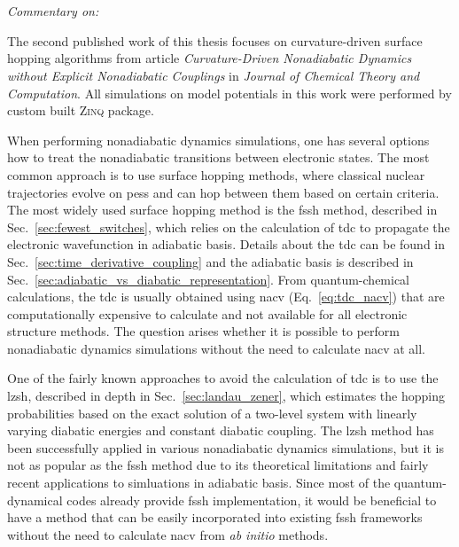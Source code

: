 \section{\filetotitle}\label{sec:curvature_driven_surface_hopping_algorithms}
\textit{Commentary on: }

The second published work of this thesis focuses on curvature-driven surface hopping algorithms from article \textit{Curvature-Driven Nonadiabatic Dynamics without Explicit Nonadiabatic Couplings} in \textit{Journal of Chemical Theory and Computation}. All simulations on model potentials in this work were performed by custom built \textsc{Zinq} package.\supercite{10.5281/zenodo.18386143}

When performing nonadiabatic dynamics simulations, one has several options how to treat the nonadiabatic transitions between electronic states. The most common approach is to use surface hopping methods, where classical nuclear trajectories evolve on \glspl{pes} and can hop between them based on certain criteria. The most widely used surface hopping method is the \acrfull{fssh} method, described in Sec.~\ref{sec:fewest_switches}, which relies on the calculation of \acrfull{tdc} to propagate the electronic wavefunction in adiabatic basis. Details about the \acrshort{tdc} can be found in Sec.~\ref{sec:time_derivative_coupling} and the adiabatic basis is described in Sec.~\ref{sec:adiabatic_vs_diabatic_representation}. From quantum-chemical calculations, the \acrshort{tdc} is usually obtained using \acrfull{nacv} (Eq.~\eqref{eq:tdc_nacv}) that are computationally expensive to calculate and not available for all electronic structure methods. The question arises whether it is possible to perform nonadiabatic dynamics simulations without the need to calculate \acrshort{nacv} at all.

One of the fairly known approaches to avoid the calculation of \acrshort{tdc} is to use the \acrfull{lzsh}, described in depth in Sec.~\ref{sec:landau_zener}, which estimates the hopping probabilities based on the exact solution of a two-level system with linearly varying diabatic energies and constant diabatic coupling. The \acrshort{lzsh} method has been successfully applied in various nonadiabatic dynamics simulations, but it is not as popular as the \acrshort{fssh} method due to its theoretical limitations and fairly recent applications to simluations in adiabatic basis. Since most of the quantum-dynamical codes already provide \acrshort{fssh} implementation, it would be beneficial to have a method that can be easily incorporated into existing \acrshort{fssh} frameworks without the need to calculate \acrshort{nacv} from \textit{ab initio} methods.

